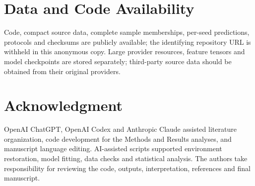 \documentclass[conference]{IEEEtran}
\begin{document}
\section*{Data and Code Availability}

Code, compact source data, complete sample memberships, per-seed predictions, protocols and checksums are publicly available; the identifying repository URL is withheld in this anonymous copy. Large provider resources, feature tensors and model checkpoints are stored separately; third-party source data should be obtained from their original providers.

\section*{Acknowledgment}

OpenAI ChatGPT, OpenAI Codex and Anthropic Claude assisted literature organization, code development for the Methods and Results analyses, and manuscript language editing. AI-assisted scripts supported environment restoration, model fitting, data checks and statistical analysis. The authors take responsibility for reviewing the code, outputs, interpretation, references and final manuscript.
\end{document}
